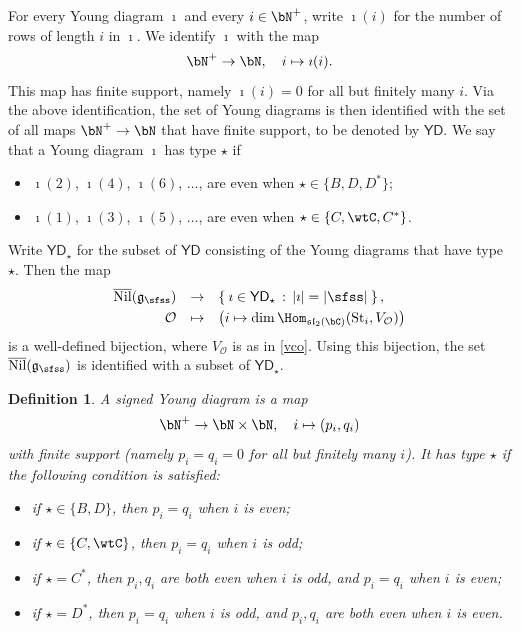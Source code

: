 \documentclass[11pt,a4paper]{amsart}
\def\YD{{\mathsf{YD}}}
\def\abs#1{\left|{#1}\right|}
\def\fsl{\mathfrak{sl}}
\newcommand{\CO}{{\mathcal {O}}}
\newcommand{\slt}{\operatorname{SL}_2(\mathbb{R})}
\newcommand{\g}{\mathfrak g}
\numberwithin{equation}{section}
\newtheorem{defn}[thm]{Definition}
\theoremstyle{remark}
\def\slt{\fsl_2(\bC)}
\def\Nil{\overline{\mathrm{Nil}}}
\def\YD{{\mathsf{YD}}}
\def\St#1{\mathrm{St}_{#1}}
\begin{document}
For every Young diagram $\imath$ and every $i\in \bN^+$, write $\imath(i)$ for the number of rows of length $i$ in $\imath$.  We identify $\imath$ with the map
\[
  \bN^+\rightarrow \bN, \quad i\mapsto \imath(i).
\]
This map has  finite support, namely $\imath(i)=0$ for all but finitely many $i$. Via the above identification, the set of Young diagrams is then identified with the set of all maps $\bN^+\rightarrow \bN$
that have finite support, to be denoted by $\YD$.  
We say that a Young diagram $\imath$ has type $\star$ if 
\begin{itemize}
    \item $\imath(2)$, $\imath(4)$, $\imath(6)$, $\dots$, are even when $\star\in \{B,D, D^*\}$; 
    \item $\imath(1)$, $\imath(3)$, $\imath(5)$, $\dots$, are even when $\star\in \{C,\wtC, C^*\}$.
\end{itemize}
Write $\YD_\star$ for the subset of $\YD$ consisting of the Young diagrams that have type $\star$. Then the map
\begin{equation}\label{YDO}
  \begin{array}{rcl}
  \Nil(\g_{\sfss})&\rightarrow& \Set{\imath\in \YD_\star \,:\,  \abs{\imath}=\abs{\sfss}}, \smallskip\\
  \CO&\mapsto& \left(i\mapsto \dim \Hom_{\slt}(\St{i}, V_\CO)\right)
  \end{array}
\end{equation}
is a well-defined bijection, where $V_\CO$ is as in \eqref{vco}. Using this bijection, the set $\Nil(\g_{\sfss})$ is  identified with a subset of $\YD_\star$.

\begin{defn}
 A signed Young diagram  is a map
 \[
 \bN^+\rightarrow \bN\times \bN,\quad i\mapsto (p_i,q_i)
 \]
 with finite support (namely $p_i=q_i=0$ for all but finitely many $i$). It has  type $\star$ if the following condition is satisfied: 
 \begin{itemize}
     \item if $\star\in\{B,D\}$, then $p_i=q_i$ when $i$ is even;
     \item if $\star\in\{C,\wtC\}$, then $p_i=q_i$ when $i$ is odd;
     \item if $\star=C^*$, then $p_i, q_i$ are both even when $i$ is odd, and $p_i= q_i$  when $i$ is even;
     \item if $\star=D^*$, then  $p_i= q_i$  when $i$ is odd, and $p_i, q_i$ are both even when $i$ is even.
 \end{itemize}
\end{defn}
\end{document}
